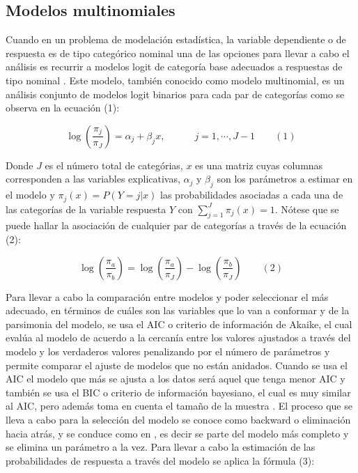 \documentclass[]{article}
\theoremstyle{definition}
\theoremstyle{definition}
\theoremstyle{definition}
\theoremstyle{remark}
\begin{document}
\subsection{Modelos multinomiales}\label{modelos-multinomiales}

Cuando en un problema de modelación estadística, la variable dependiente
o de respuesta es de tipo categórico nominal una de las opciones para
llevar a cabo el análisis es recurrir a modelos logit de categoría base
adecuados a respuestas de tipo nominal \citep[pp.~267]{Agresti}. Este
modelo, también conocido como modelo multinomial, es un análisis
conjunto de modelos logit binarios para cada par de categorías como se
observa en la ecuación (1):

\[\log { \left( \frac { { \pi  }_{ j } }{ { \pi  }_{ J } }  \right)  } ={ \alpha  }_{ j }+{ \beta  }_{ j }x,\quad \quad \quad j=1,\cdots ,J-1 \quad \quad(1)\]

Donde \(J\) es el número total de categórias, \(x\) es una matriz cuyas
columnas corresponden a las variables explicativas, \({ \alpha }_{ j }\)
y \({ \beta }_{ j }\) son los parámetros a estimar en el modelo y
\({ \pi }_{ j }(x)=P(Y=j|x)\) las probabilidades asociadas a cada una de
las categorías de la variable respuesta \(Y\) con
\(\sum _{ j=1 }^{ J }{ { \pi }_{ j }(x) } =1\). Nótese que se puede
hallar la asociación de cualquier par de categorías a través de la
ecuación (2):

\[\log { \left( \frac { { \pi  }_{ a } }{ { \pi  }_{ b } }  \right)  } =\log { \left( \frac { { \pi  }_{ a } }{ { \pi  }_{ J } }  \right)  } -\log { \left( \frac { { \pi  }_{ b } }{ { \pi  }_{ J } }  \right)  } \quad \quad (2)\]

Para llevar a cabo la comparación entre modelos y poder seleccionar el
más adecuado, en términos de cuáles son las variables que lo van a
conformar y de la parsimonia del modelo, se usa el AIC o criterio de
información de Akaike, el cual evalúa al modelo de acuerdo a la cercanía
entre los valores ajustados a través del modelo y los verdaderos valores
penalizando por el número de parámetros \citep[pp.~216]{Agresti} y
permite comparar el ajuste de modelos que no están anidados. Cuando se
usa el AIC el modelo que más se ajusta a los datos será aquel que tenga
menor AIC y también se usa el BIC o criterio de información bayesiano,
el cual es muy similar al AIC, pero además toma en cuenta el tamaño de
la muestra \citep[pp.~257]{Agresti}. El proceso que se lleva a cabo para
la selección del modelo se conoce como backward o eliminación hacia
atrás, y se conduce como en \citet[ pp.~214]{Agresti}, es decir se parte
del modelo más completo y se elimina un parámetro a la vez. Para llevar
a cabo la estimación de las probabilidades de respuesta a través del
modelo se aplica la fórmula (3):
\end{document}

